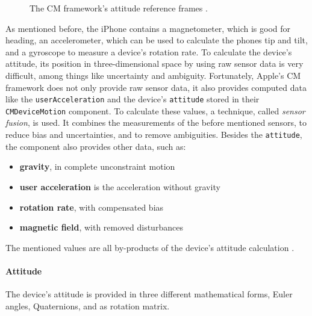 \begin{figure}[p]
      
	\caption{The \acl{CM} framework's attitude reference frames \citep{apple:wwdc_2012_pham}.}
	\label{fig:cm_referenceframes}
\end{figure}


As mentioned before, the iPhone contains a magnetometer, which is good for heading, an accelerometer, which can be used to calculate the phones tip and tilt, and a gyroscope to measure a device's rotation rate. To calculate the device's attitude, its position in three-dimensional space by using raw sensor data is very difficult, among things like uncertainty and ambiguity. Fortunately, Apple's \ac{CM} framework does not only provide raw sensor data, it also provides computed data like the \texttt{userAcceleration} and the device's \texttt{attitude} stored in their \texttt{CMDeviceMotion} component. To calculate these values, a technique, called \emph{sensor fusion}, is used. It combines the measurements of the before mentioned sensors, to reduce bias and uncertainties, and to remove ambiguities. Besides the \texttt{attitude}, the component also provides other data, such as:
\begin{itemize}
  \item \textbf{gravity}, in complete unconstraint motion
  \item \textbf{user acceleration} is the acceleration without gravity
  \item \textbf{rotation rate}, with compensated bias
  \item \textbf{magnetic field}, with removed disturbances
\end{itemize}

\noindent The mentioned values are all by-products of the device's attitude calculation \citep{apple:wwdc_2012_pham,apple:ios_doc_cm}.

\paragraph{Attitude} The device's attitude is provided in three different mathematical forms, Euler angles, Quaternions, and as rotation matrix.

